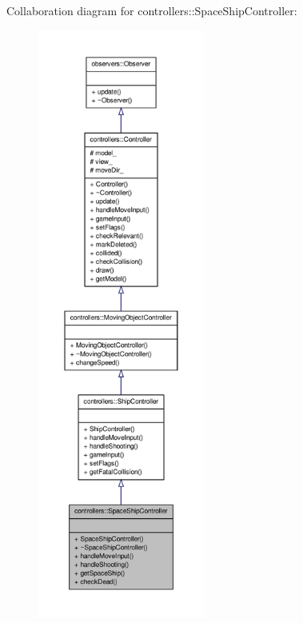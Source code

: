 \-Collaboration diagram for controllers\-:\-:\-Space\-Ship\-Controller\-:
\nopagebreak
\begin{figure}[H]
\begin{center}
\leavevmode
\includegraphics[height=550pt]{dc/dd9/classcontrollers_1_1SpaceShipController__coll__graph}
\end{center}
\end{figure}

